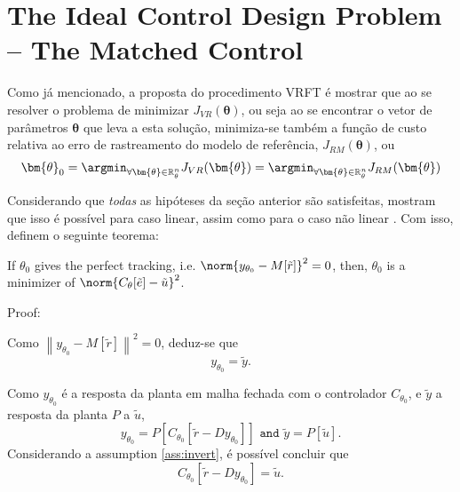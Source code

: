 \section{The Ideal Control Design Problem -- The Matched Control}%
\label{sec:the_ideal_control_design_problem}

Como já mencionado, a proposta do procedimento VRFT é mostrar que ao se resolver o problema de minimizar  $J_{VR}(\bm{\theta})$, ou seja ao se encontrar o vetor de parâmetros $\bm{\theta}$ que leva a esta solução, minimiza-se também a função de custo relativa ao erro de rastreamento do modelo de referência, $J_{RM}(\bm{\theta})$, ou 
\begin{equation}
   \bm{\theta}_0 = \argmin_{\forall \bm{\theta} \in \mathbb{R}^n_\theta} J_{VR}(\bm{\theta}) = \argmin_{\forall \bm{\theta} \in \mathbb{R}^n_\theta} J_{RM}(\bm{\theta})
\label{eq:theta_JVR_JRM}
\end{equation}

Considerando que \textit{todas} as hipóteses da seção anterior são satisfeitas, \cite{campi2002} mostram que isso é possível para caso linear, assim como para o caso não linear \citep{campi2006}. Com isso, definem o seguinte teorema:


\begin{thm} 
   \label{thr:teoremaVRF1}
   If $\theta_0$ gives the perfect tracking, i.e. $\norm{y_{\theta_0} - M[\tilde{r}] }^2 = 0$, then, $\theta_0$ is a minimizer of $\norm{C_\theta[\tilde{e}] - \tilde{u}}^2$.
\end{thm}

Proof:

Como $\left\|y_{\theta_{0}}-M[\tilde{r}]\right\|^{2}=0$, deduz-se que
\begin{equation}
y_{\theta_{0}}=\tilde{y}.
\label{eq:yteta_ytilde}
\end{equation}

Como $y_{\theta_0}$ é a resposta da planta em malha fechada com o controlador $C_{\theta_0}$, e $\tilde{y}$ a resposta da planta $P$ a $\tilde{u}$,
\begin{equation*}
y_{\theta_{0}}=P\left[C_{\theta_{0}}\left[\tilde{r}-D y_{\theta_{0}}\right]\right] \texttt{ and } \tilde{y}=P[\tilde{u}].
\label{eq:}
\end{equation*}
Considerando a assumption \ref{ass:invert}, é possível concluir que
\begin{equation}
   C_{\theta_{0}}\left[\tilde{r}-D y_{\theta_{0}}\right]=\tilde{u}.
\label{eq:Cteta}
\end{equation}

